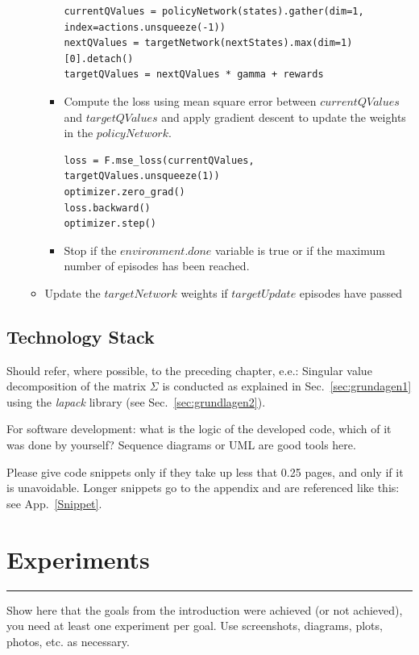 \documentclass[12pt,oneside]{article}
\begin{document}
\begin{enumerate}
\begin{itemize}
\begin{itemize}
\begin{verbatim}
currentQValues = policyNetwork(states).gather(dim=1, index=actions.unsqueeze(-1))
nextQValues = targetNetwork(nextStates).max(dim=1)[0].detach()
targetQValues = nextQValues * gamma + rewards
\end{verbatim}
			\item Compute the loss using mean square error between $currentQValues$ and $targetQValues$ and apply gradient descent to update the weights in the $policyNetwork$.
\begin{verbatim}
loss = F.mse_loss(currentQValues, targetQValues.unsqueeze(1))
optimizer.zero_grad()
loss.backward()
optimizer.step()
\end{verbatim}
			\item Stop if the $environment.done$ variable is true or if the maximum number of episodes has been reached.
		\end{itemize} 
		\item Update the $targetNetwork$ weights if $targetUpdate$ episodes have passed
	\end{itemize}

\end{enumerate}


\subsection{Technology Stack} 








Should refer, where possible, to the preceding chapter, e.e.:
Singular value decomposition of the matrix $\Sigma$ is conducted as explained in Sec.~\ref{sec:grundagen1} using the \textit{lapack} library (see Sec.~\ref{sec:grundlagen2}).

For software development: what is the logic of the developed code, which of it was done by yourself? Sequence diagrams or UML are good tools here.

Please give code snippets only if they take up less that 0.25 pages, and only if it is unavoidable. Longer snippets go to the appendix and are referenced like this: see App.~\ref{Snippet}.

\section{Experiments}\label{sec:exp}



\par\noindent\rule{\textwidth}{0.4pt}
Show here that the goals from the introduction were achieved (or not achieved), you need at least one experiment per goal. Use screenshots, diagrams, plots, photos, etc. as necessary.
\end{document}
